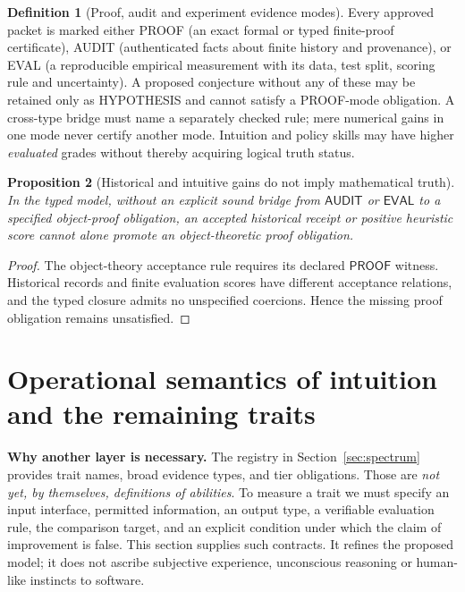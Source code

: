 \documentclass[11pt,letterpaper]{article}
\theoremstyle{definition}
\newtheorem{definition}{Definition}[section]
\theoremstyle{plain}
\newtheorem{proposition}[definition]{Proposition}
\theoremstyle{definition}
\begin{document}
\begin{definition}[Proof, audit and experiment evidence modes]
Every approved packet is marked either \textsf{PROOF} (an exact formal or typed finite-proof certificate), \textsf{AUDIT} (authenticated facts about finite history and provenance), or \textsf{EVAL} (a reproducible empirical measurement with its data, test split, scoring rule and uncertainty). A proposed conjecture without any of these may be retained only as \textsf{HYPOTHESIS} and cannot satisfy a \textsf{PROOF}-mode obligation. A cross-type bridge must name a separately checked rule; mere numerical gains in one mode never certify another mode. Intuition and policy skills may have higher \emph{evaluated} grades without thereby acquiring logical truth status.
\end{definition}

\begin{proposition}[Historical and intuitive gains do not imply mathematical truth]
In the typed model, without an explicit sound bridge from $\mathsf{AUDIT}$ or $\mathsf{EVAL}$ to a specified object-proof obligation, an accepted historical receipt or positive heuristic score cannot alone promote an object-theoretic proof obligation.
\end{proposition}
\begin{proof}The object-theory acceptance rule requires its declared $\mathsf{PROOF}$ witness. Historical records and finite evaluation scores have different acceptance relations, and the typed closure admits no unspecified coercions. Hence the missing proof obligation remains unsatisfied.\end{proof}


\section{Operational semantics of intuition and the remaining traits}\label{gl-first-W0-s7}
\label{sec:operational-traits}
\textbf{Why another layer is necessary.} The registry in Section~\ref{sec:spectrum}
provides trait names, broad evidence types, and tier obligations. Those are
\emph{not yet, by themselves, definitions of abilities}. To measure a trait we
must specify an input interface, permitted information, an output type, a
verifiable evaluation rule, the comparison target, and an explicit condition
under which the claim of improvement is false. This section supplies such
contracts. It refines the proposed model; it does not ascribe subjective
experience, unconscious reasoning or human-like instincts to software.
\end{document}
